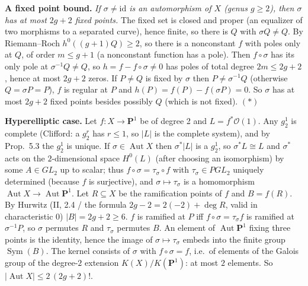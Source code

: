 \documentclass[11pt]{article}
\begin{document}
\pf
\textbf{A fixed point bound.} \emph{If $\sigma\ne\mathrm{id}$ is an automorphism of $X$ (genus $g\ge2$), then $\sigma$ has at most $2g+2$ fixed points.} The fixed set is closed and proper (an equalizer of two morphisms to a separated curve), hence finite, so there is $Q$ with $\sigma Q\ne Q$. By Riemann--Roch $h^0((g+1)Q)\ge2$, so there is a nonconstant $f$ with poles only at $Q$, of order $m\le g+1$ (a nonconstant function has a pole). Then $f\circ\sigma$ has its only pole at $\sigma^{-1}Q\ne Q$, so $h=f-f\circ\sigma\ne0$ has poles of total degree $2m\le2g+2$, hence at most $2g+2$ zeros. If $P\ne Q$ is fixed by $\sigma$ then $P\ne\sigma^{-1}Q$ (otherwise $Q=\sigma P=P$), $f$ is regular at $P$ and $h(P)=f(P)-f(\sigma P)=0$. So $\sigma$ has at most $2g+2$ fixed points besides possibly $Q$ (which is not fixed). \hfill$(\ast)$

\textbf{Hyperelliptic case.} Let $f:X\to\mathbf P^1$ be of degree 2 and $L=f^*\mathcal O(1)$. Any $g^1_2$ is complete (Clifford: a $g^r_2$ has $r\le1$, so $|L|$ is the complete system), and by Prop.~5.3 the $g^1_2$ is unique. If $\sigma\in\operatorname{Aut}X$ then $\sigma^*|L|$ is a $g^1_2$, so $\sigma^*L\cong L$ and $\sigma^*$ acts on the $2$-dimensional space $H^0(L)$ (after choosing an isomorphism) by some $A\in GL_2$ up to scalar; thus $f\circ\sigma=\tau_\sigma\circ f$ with $\tau_\sigma\in PGL_2$ uniquely determined (because $f$ is surjective), and $\sigma\mapsto\tau_\sigma$ is a homomorphism $\operatorname{Aut}X\to\operatorname{Aut}\mathbf P^1$. Let $R\subseteq X$ be the ramification points of $f$ and $B=f(R)$. By Hurwitz (II, 2.4 / the formula $2g-2=2(-2)+\deg R$, valid in characteristic $0$) $|B|=2g+2\ge6$. $f$ is ramified at $P$ iff $f\circ\sigma=\tau_\sigma f$ is ramified at $\sigma^{-1}P$, so $\sigma$ permutes $R$ and $\tau_\sigma$ permutes $B$. An element of $\operatorname{Aut}\mathbf P^1$ fixing three points is the identity, hence the image of $\sigma\mapsto\tau_\sigma$ embeds into the finite group $\operatorname{Sym}(B)$. The kernel consists of $\sigma$ with $f\circ\sigma=f$, i.e.\ of elements of the Galois group of the degree-$2$ extension $K(X)/K(\mathbf P^1)$: at most $2$ elements. So $|\operatorname{Aut}X|\le2\,(2g+2)!$.
\end{document}
